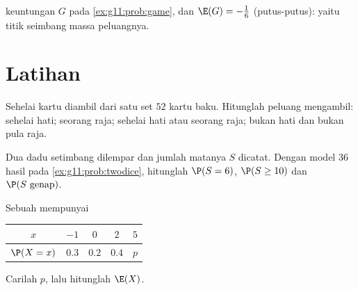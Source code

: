 \begin{omfigure}

{\small {} keuntungan $G$ pada
\cref{ex:g11:prob:game}, dan  $\E(G) = -\frac16$ (putus-putus):
yaitu titik seimbang massa peluangnya.}
\end{omfigure}

\section{Latihan}

\begin{exercise}[$\star$]\label{exo:g11:prob:1}
Sehelai kartu diambil dari satu set $52$ kartu baku. Hitunglah peluang
mengambil: sehelai hati; seorang raja; sehelai hati atau seorang raja; bukan
hati dan bukan pula raja.
\end{exercise}

\begin{exercise}[$\star$]\label{exo:g11:prob:2}
Dua dadu setimbang dilempar dan jumlah matanya $S$ dicatat. Dengan
model $36$ hasil pada \cref{ex:g11:prob:twodice}, hitunglah $\P(S = 6)$,
$\P(S \geq 10)$ dan $\P(S \text{ genap})$.
\end{exercise}

\begin{exercise}[$\star$]\label{exo:g11:prob:3}
Sebuah  mempunyai 
\begin{center}
\begin{tabular}{c|cccc}
$x$ & $-1$ & $0$ & $2$ & $5$\\
\hline
$\P(X=x)$ & $0.3$ & $0.2$ & $0.4$ & $p$
\end{tabular}
\end{center}
Carilah $p$, lalu hitunglah $\E(X)$.
\end{exercise}

